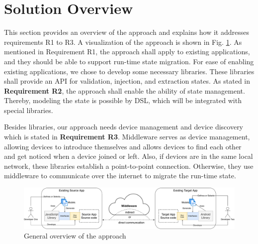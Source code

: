 \section{Solution Overview}
This section provides an overview of the approach and explains how it addresses requirements R1 to R3.
A visualization of the approach is shown in Fig. \ref{fig:solution-overview}. As mentioned in Requirement R1, the approach shall apply to existing applications, and they should be able to support run-time state migration. For ease of enabling existing applications, we chose to develop some necessary libraries. These libraries shall provide an API for validation, injection, and extraction states. As stated in \textbf{Requirement R2}, the approach shall enable the ability of state management. Thereby, modeling the state is possible by DSL, which will be integrated with special libraries.

Besides libraries, our approach needs device management and device discovery which is stated in \textbf{Requirement R3}. Middleware serves as device management, allowing devices to introduce themselves and allows devices to find each other and get noticed when a device joined or left. Also, if devices are in the same local network, these libraries establish a point-to-point connection. Otherwise, they use middleware to communicate over the internet to migrate the run-time state.

\begin{figure}[!b]
    \includegraphics[width=\linewidth]{../figures/solution-overview}
    \centering
    \caption{General overview of the approach}
    \label{fig:solution-overview}
\end{figure}
